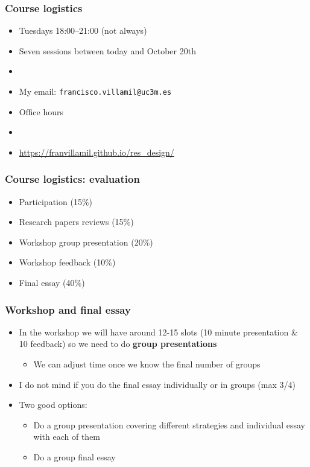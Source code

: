 \documentclass[aspectratio=43]{beamer}
\begin{document}
\begin{frame}
\frametitle{Course logistics}
\centering

\begin{itemize}
  \item Tuesdays 18:00--21:00 (not always)
  \item Seven sessions between today and October 20th
  \item[]
  \item My email: \texttt{francisco.villamil@uc3m.es}
  \item Office hours
  \item[]
  \item \url{https://franvillamil.github.io/res_design/}
\end{itemize}

\end{frame}

\begin{frame}
\frametitle{Course logistics: evaluation}
\centering

\begin{itemize}
  \item Participation (15\%)
  \item Research papers reviews (15\%)
  \item Workshop group presentation (20\%)
  \item Workshop feedback (10\%)
  \item Final essay (40\%)
\end{itemize}

\end{frame}

\begin{frame}
\frametitle{Workshop and final essay}
\centering

\begin{itemize}
  \item In the workshop we will have around 12-15 slots (10 minute presentation \& 10 feedback) so we need to do \textbf{group presentations}
  \begin{itemize}
    \item We can adjust time once we know the final number of groups
  \end{itemize}
  \item I do not mind if you do the final essay individually or in groups (max 3/4)
  \item Two good options:
  \begin{itemize}
    \item Do a group presentation covering different strategies and individual essay with each of them
    \item Do a group final essay
  \end{itemize}
\end{itemize}

\end{frame}
\end{document}
